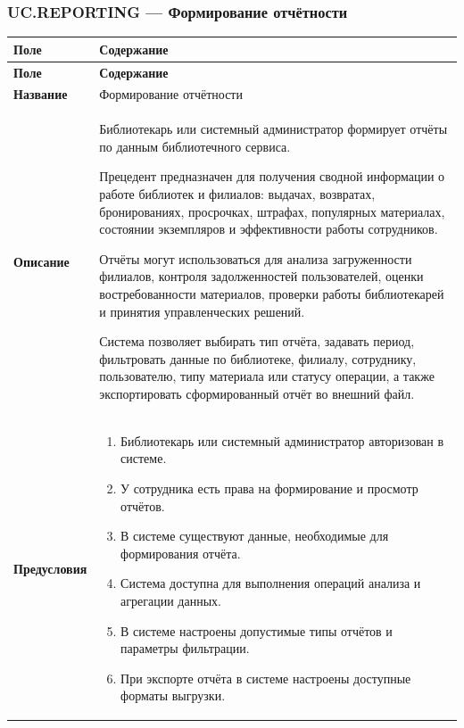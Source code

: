 \documentclass[12pt,a4paper]{article}
\begin{document}
		\label{tab:uc-catalog-management-specification}
		\clearpage
		
		\subsubsection{UC.REPORTING --- Формирование отчётности}
		
		\begin{xltabular}{\textwidth}{
				|>{\raggedright\arraybackslash}p{2.7cm}
				|>{\raggedright\arraybackslash}X|
			}
			\hline
			\textbf{Поле} & \textbf{Содержание} \\
			\hline
			\endfirsthead
			
			\hline
			\textbf{Поле} & \textbf{Содержание} \\
			\hline
			\endhead
			
			\hline
			\endfoot
			
			\textbf{Название} &
			Формирование отчётности \\
			\hline
			
			\textbf{Описание} &
			Библиотекарь или системный администратор формирует отчёты по данным
			библиотечного сервиса.
			
			Прецедент предназначен для получения сводной информации о работе
			библиотек и филиалов: выдачах, возвратах, бронированиях, просрочках,
			штрафах, популярных материалах, состоянии экземпляров и эффективности
			работы сотрудников.
			
			Отчёты могут использоваться для анализа загруженности филиалов,
			контроля задолженностей пользователей, оценки востребованности
			материалов, проверки работы библиотекарей и принятия управленческих
			решений.
			
			Система позволяет выбирать тип отчёта, задавать период, фильтровать
			данные по библиотеке, филиалу, сотруднику, пользователю, типу материала
			или статусу операции, а также экспортировать сформированный отчёт во
			внешний файл. \\
			\hline
			
			\textbf{Предусловия} &
			\begin{enumerate}
				\item Библиотекарь или системный администратор авторизован в системе.
				\item У сотрудника есть права на формирование и просмотр отчётов.
				\item В системе существуют данные, необходимые для формирования отчёта.
				\item Система доступна для выполнения операций анализа и агрегации данных.
				\item В системе настроены допустимые типы отчётов и параметры фильтрации.
				\item При экспорте отчёта в системе настроены доступные форматы выгрузки.
			\end{enumerate} \\
			\hline
			

\end{xltabular}
\end{document}
